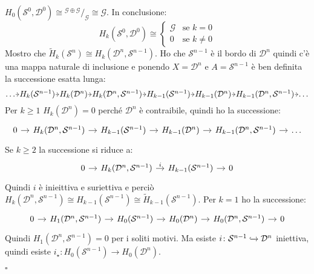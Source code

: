 \documentclass[10pt, twoside=false, x11names]{scrbook}
\newenvironment{proof}{{\textbf{Dimostrazione}:}}{\hfill $\square$}
\newcommand{\Sph}[1][]{\mathcal{S}^#1}
\newcommand{\Disk}[1][]{\mathcal{D}^#1}
\newcommand{\incl}{\xhookrightarrow{}}
\newcommand*\quot[2]{{^{\textstyle #1}\big/_{\textstyle #2}}}
\begin{document}
\begin{proof}
  $ H_0(\Sph{0}, \Disk{0}) \cong \quot{\mathcal{G} \oplus \mathcal{G}}{\mathcal{G}} \cong \mathcal{G} $.
  In conclusione:
  \[
    H_k(\Sph{0}, \Disk{0}) \cong
    \begin{cases}
      \mathcal{G} & \text{se } k = 0 \\
      0 & \text{se } k \not =  0
    \end{cases}
  \]
  Mostro che $ \tilde{H}_k(\Sph{n}) \cong H_k(\Disk{n}, \Sph{n-1}) $.
  Ho che $ \Sph{n-1} $ è il bordo di $ \Disk{n} $ quindi c'è una mappa naturale di inclusione
  e ponendo $ X = \Disk{n} $ e $ A = \Sph{n-1} $ è ben definita la successione esatta lunga:
  \[
    \begin{tikzcd}[nodes={column sep=4.5pt, inner sep=0.5pt}]
      \dots \rar & H_k(\Sph{n-1}) \rar & H_k(\Disk{n}) \rar & H_k(\Disk{n}, \Sph{n-1}) \rar
      & H_{k-1}(\Sph{n-1}) \rar & H_{k-1}(\Disk{n}) \rar & H_{k-1}(\Disk{n}, \Sph{n-1}) \rar & \dots
    \end{tikzcd}
  \]
  Per $ k \geq 1 $ $ H_k(\Disk{n}) = 0 $ perché $ \Disk{n} $ è contraibile, quindi ho la successione:
  \[
    \begin{tikzcd}[nodes={column sep=10pt}]
      0 \rar & H_k(\Disk{n}, \Sph{n-1}) \rar & H_{k-1}(\Sph{n-1}) \rar & H_{k-1}(\Disk{n}) \rar & H_{k-1}(\Disk{n}, \Sph{n-1}) \rar & \dots
    \end{tikzcd}
  \]
  Se $ k \geq 2 $ la successione si riduce a:
  \[
    \begin{tikzcd}[nodes={column sep=10pt}]
      0 \rar & H_k(\Disk{n}, \Sph{n-1}) \rar{i} & H_{k-1}(\Sph{n-1}) \rar & 0
    \end{tikzcd}
  \]
  Quindi $ i $ è inieittiva e suriettiva e perciò
  $ H_k(\Disk{n}, \Sph{n-1}) \cong H_{k-1}(\Sph{n-1}) \cong \tilde{H}_{k-1}(\Sph{n-1}) $.
  Per $ k = 1 $ ho la successione:
  \[
    \begin{tikzcd}[nodes={column sep=10pt}]
      0 \rar & H_1(\Disk{n}, \Sph{n-1}) \rar & H_0(\Sph{n-1}) \rar & H_0(\Disk{n}) \rar & H_0(\Disk{n}, \Sph{n-1}) \rar & 0
    \end{tikzcd}
  \]
  Quindi $ H_1(\Disk{n}, \Sph{n-1}) = 0 $ per i soliti motivi.
  Ma esiste $ i \colon \Sph{n-1} \incl \Disk{n} $ iniettiva, quindi esiste $ i_\star \colon H_0(\Sph{n-1}) \to H_0(\Disk{n}) $.

\end{proof}
\end{document}
